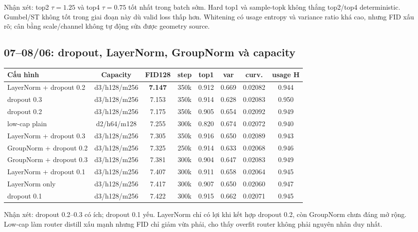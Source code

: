 \documentclass[11pt,a4paper]{article}
\newcommand{\best}[1]{\textbf{#1}}
\begin{document}
Nhận xét: top2 \(\tau=1.25\) và top4 \(\tau=0.75\) tốt nhất trong batch sớm. Hard top1 và sample-topk không thắng top2/top4 deterministic. Gumbel/ST không tốt trong giai đoạn này dù valid loss thấp hơn. Whitening có usage entropy và variance ratio khá cao, nhưng FID xấu rõ; cân bằng scale/channel không tự động sửa được geometry source.

\subsection{07--08/06: dropout, LayerNorm, GroupNorm và capacity}

\begin{center}
\small
\setlength{\tabcolsep}{2.5pt}
\begin{tabularx}{\linewidth}{@{}Y c c c c c c c@{}}
\toprule
\textbf{Cấu hình} & \textbf{Capacity} & \textbf{FID128} & \textbf{step} & \textbf{top1} & \textbf{var} & \textbf{curv.} & \textbf{usage H}\\
\midrule
LayerNorm + dropout 0.2 & d3/h128/m256 & \best{7.147} & 350k & 0.912 & 0.669 & 0.02082 & 0.944\\
dropout 0.3 & d3/h128/m256 & 7.153 & 350k & 0.914 & 0.628 & 0.02083 & 0.950\\
dropout 0.2 & d3/h128/m256 & 7.175 & 350k & 0.905 & 0.654 & 0.02092 & 0.949\\
low-cap plain & d2/h64/m128 & 7.255 & 300k & 0.820 & 0.674 & 0.02072 & 0.940\\
LayerNorm + dropout 0.3 & d3/h128/m256 & 7.305 & 350k & 0.916 & 0.650 & 0.02089 & 0.943\\
GroupNorm + dropout 0.2 & d3/h128/m256 & 7.325 & 250k & 0.914 & 0.633 & 0.02068 & 0.946\\
GroupNorm + dropout 0.3 & d3/h128/m256 & 7.381 & 300k & 0.904 & 0.647 & 0.02083 & 0.949\\
LayerNorm + dropout 0.1 & d3/h128/m256 & 7.407 & 300k & 0.911 & 0.658 & 0.02064 & 0.945\\
LayerNorm only & d3/h128/m256 & 7.417 & 300k & 0.907 & 0.650 & 0.02060 & 0.947\\
dropout 0.1 & d3/h128/m256 & 7.422 & 300k & 0.915 & 0.662 & 0.02071 & 0.945\\
\bottomrule
\end{tabularx}
\end{center}

Nhận xét: dropout 0.2--0.3 có ích; dropout 0.1 yếu. LayerNorm chỉ có lợi khi kết hợp dropout 0.2, còn GroupNorm chưa đáng mở rộng. Low-cap làm router distill xấu mạnh nhưng FID chỉ giảm vừa phải, cho thấy overfit router không phải nguyên nhân duy nhất.
\end{document}
